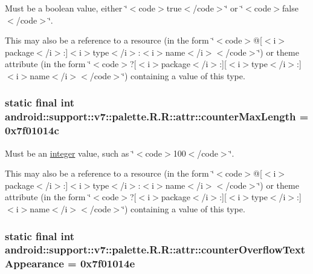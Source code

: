 Must be a boolean value, either \char`\"{}$<$code$>$true$<$/code$>$\char`\"{} or \char`\"{}$<$code$>$false$<$/code$>$\char`\"{}. 

This may also be a reference to a resource (in the form \char`\"{}$<$code$>$@\mbox{[}$<$i$>$package$<$/i$>$:\mbox{]}$<$i$>$type$<$/i$>$:$<$i$>$name$<$/i$>$$<$/code$>$\char`\"{}) or theme attribute (in the form \char`\"{}$<$code$>$?\mbox{[}$<$i$>$package$<$/i$>$:\mbox{]}\mbox{[}$<$i$>$type$<$/i$>$:\mbox{]}$<$i$>$name$<$/i$>$$<$/code$>$\char`\"{}) containing a value of this type. \hypertarget{classandroid_1_1support_1_1v7_1_1palette_1_1_r_1_1attr_acda3bcc1fb3595df96078a534f06ed6}{
\subsubsection[{counterMaxLength}]{\setlength{\rightskip}{0pt plus 5cm}static final int android::support::v7::palette.R.R::attr::counterMaxLength = 0x7f01014c}}
\label{classandroid_1_1support_1_1v7_1_1palette_1_1_r_1_1attr_acda3bcc1fb3595df96078a534f06ed6}


Must be an \hyperlink{classandroid_1_1support_1_1v7_1_1palette_1_1_r_1_1integer}{integer} value, such as \char`\"{}$<$code$>$100$<$/code$>$\char`\"{}. 

This may also be a reference to a resource (in the form \char`\"{}$<$code$>$@\mbox{[}$<$i$>$package$<$/i$>$:\mbox{]}$<$i$>$type$<$/i$>$:$<$i$>$name$<$/i$>$$<$/code$>$\char`\"{}) or theme attribute (in the form \char`\"{}$<$code$>$?\mbox{[}$<$i$>$package$<$/i$>$:\mbox{]}\mbox{[}$<$i$>$type$<$/i$>$:\mbox{]}$<$i$>$name$<$/i$>$$<$/code$>$\char`\"{}) containing a value of this type. \hypertarget{classandroid_1_1support_1_1v7_1_1palette_1_1_r_1_1attr_119cffe0f5553bfd0a00f3e7fcb64b23}{
\subsubsection[{counterOverflowTextAppearance}]{\setlength{\rightskip}{0pt plus 5cm}static final int android::support::v7::palette.R.R::attr::counterOverflowTextAppearance = 0x7f01014e}}
\label{classandroid_1_1support_1_1v7_1_1palette_1_1_r_1_1attr_119cffe0f5553bfd0a00f3e7fcb64b23}


